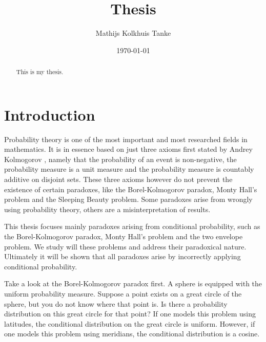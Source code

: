 \documentclass[a4paper]{report}
\title{Thesis}
\author{Mathijs Kolkhuis Tanke}
\date{\today}
\theoremstyle{plain}
\theoremstyle{definition}
\theoremstyle{remark}
\numberwithin{equation}{chapter}
\DeclareMathOperator{\1}{\mathbbm{1}}
\begin{document}
\begin{titlepage}

\maketitle
\end{titlepage}


\begin{abstract}
This is my thesis.
\end{abstract}


\setcounter{page}{2}
\tableofcontents

\chapter{Introduction}
Probability theory is one of the most important and most researched fields in mathematics. It is in essence based on just three axioms first stated by Andrey Kolmogorov \cite{Kolmogorov33}, namely that the probability of an event is non-negative, the probability measure is a unit measure and the probability measure is countably additive on disjoint sets. These three axioms however do not prevent the existence of certain paradoxes, like the Borel-Kolmogorov paradox, Monty Hall's problem and the Sleeping Beauty problem. Some paradoxes arise from wrongly using probability theory, others are a misinterpretation of results.

This thesis focuses mainly paradoxes arising from conditional probability, such as the Borel-Kolmogorov paradox, Monty Hall's problem and the two envelope problem. We study will these problems and address their paradoxical nature. Ultimately it will be shown that all paradoxes arise by incorrectly applying conditional probability.

Take a look at the Borel-Kolmogorov paradox first. A sphere is equipped with the uniform probability measure. Suppose a point exists on a great circle of the sphere, but you do not know where that point is. Is there a probability distribution on this great circle for that point? If one models this problem using latitudes, the conditional distribution on the great circle is uniform. However, if one models this problem using meridians, the conditional distribution is a cosine.
\end{document}
